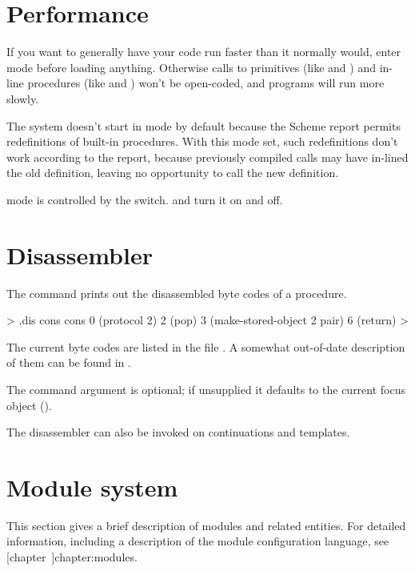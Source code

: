 \section{Performance}
\label{section:performance}

If you want to generally have your code run faster than it normally
would, enter  mode before loading anything.  Otherwise
calls to primitives (like \code{+} and ) and in-line procedures
(like  and ) won't be open-coded, and programs will run
more slowly.

The system doesn't start in  mode by default because the
Scheme report permits redefinitions of built-in procedures.  With
this mode set, such redefinitions don't work according to the report,
because previously compiled calls may have in-lined the old
definition, leaving no opportunity to call the new definition.

 mode is controlled by the  switch.
 and  turn it on and off.

\section{Disassembler}

The  command prints out the disassembled byte codes of a procedure.
\begin{example}
> ,dis cons
cons
  0 (protocol 2)
  2 (pop)
  3 (make-stored-object 2 pair)
  6 (return)
> 
\end{example}
The current byte codes are listed in the file .
A somewhat out-of-date description of them can be found in
\cite{Kelsey-Rees:Scheme48}.

The command argument is optional; if unsupplied it defaults to the
current focus object (\code{\#\#}).

The disassembler can also be invoked on continuations and templates.

\section{Module system}
\label{module-guide}

This section gives a brief description of modules and related entities.
For detailed information, including a description of the module
 configuration language, see 
[chapter~\Ref]{chapter:modules}.

